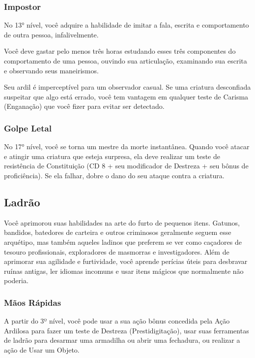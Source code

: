 \documentclass{RPG_Adventure}[2021/10/20]
\begin{document}
\begin{multicols}{2}
\subsubsection{Impostor}%

No 13° nível, você adquire a habilidade de imitar a fala, escrita e
comportamento de outra pessoa, infalivelmente.

Você deve gastar pelo menos três horas estudando esses três componentes do
comportamento de uma pessoa, ouvindo sua articulação, examinando sua escrita e
observando seus maneirismos.

Seu ardil é imperceptível para um observador casual. Se uma criatura desconfiada
suspeitar que algo está errado, você tem vantagem em qualquer teste de Carisma
(Enganação) que você fizer para evitar ser detectado.

\subsubsection{Golpe Letal}%

No 17° nível, você se torna um mestre da morte instantânea. Quando você atacar e
atingir uma criatura que esteja surpresa, ela deve realizar um teste de
resistência de Constituição (CD 8 + seu modificador de Destreza + seu bônus de
proficiência). Se ela falhar, dobre o dano do seu ataque contra a criatura.

\subsection*{Ladrão}%

Você aprimorou suas habilidades na arte do furto de pequenos itens. Gatunos,
bandidos, batedores de carteira e outros criminosos geralmente seguem esse
arquétipo, mas também aqueles ladinos que preferem se ver como caçadores de
tesouro profissionais, exploradores de masmorras e investigadores. Além de
aprimorar sua agilidade e furtividade, você aprende perícias úteis para
desbravar ruínas antigas, ler idiomas incomuns e usar itens mágicos que
normalmente não poderia.

\subsubsection{Mãos Rápidas}%

A partir do 3º nível, você pode usar a sua ação bônus concedida pela Ação
Ardilosa para fazer um teste de Destreza (Prestidigitação), usar suas
ferramentas de ladrão para desarmar uma armadilha ou abrir uma fechadura, ou
realizar a ação de Usar um Objeto.


\end{multicols}
\end{document}
